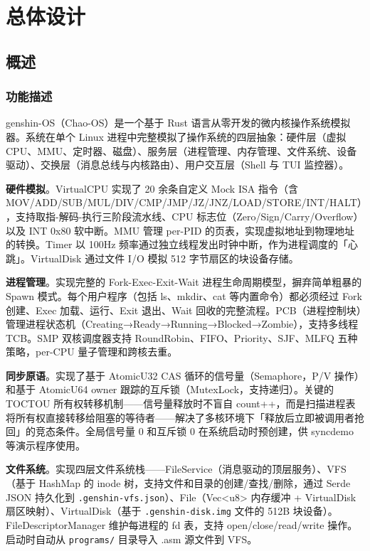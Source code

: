 \documentclass[UTF8,a4paper,12pt]{ctexart}
\begin{document}
\newpage


\section{总体设计}

\subsection{概述}

\subsubsection{功能描述}

genshin-OS（Chao-OS）是一个基于 Rust 语言从零开发的微内核操作系统模拟器。系统在单个 Linux 进程中完整模拟了操作系统的四层抽象：硬件层（虚拟 CPU、MMU、定时器、磁盘）、服务层（进程管理、内存管理、文件系统、设备驱动）、交换层（消息总线与内核路由）、用户交互层（Shell 与 TUI 监控器）。

\textbf{硬件模拟}。VirtualCPU 实现了 20 余条自定义 Mock ISA 指令（含 MOV/ADD/SUB/MUL/DIV/CMP/JMP/JZ/JNZ/LOAD/STORE/INT/HALT），支持取指-解码-执行三阶段流水线、CPU 标志位（Zero/Sign/Carry/Overflow）以及 INT 0x80 软中断。MMU 管理 per-PID 的页表，实现虚拟地址到物理地址的转换。Timer 以 100Hz 频率通过独立线程发出时钟中断，作为进程调度的「心跳」。VirtualDisk 通过文件 I/O 模拟 512 字节扇区的块设备存储。

\textbf{进程管理}。实现完整的 Fork-Exec-Exit-Wait 进程生命周期模型，摒弃简单粗暴的 Spawn 模式。每个用户程序（包括 ls、mkdir、cat 等内置命令）都必须经过 Fork 创建、Exec 加载、运行、Exit 退出、Wait 回收的完整流程。PCB（进程控制块）管理进程状态机（Creating→Ready→Running→Blocked→Zombie），支持多线程 TCB。SMP 双核调度器支持 RoundRobin、FIFO、Priority、SJF、MLFQ 五种策略，per-CPU 量子管理和跨核去重。

\textbf{同步原语}。实现了基于 AtomicU32 CAS 循环的信号量（Semaphore，P/V 操作）和基于 AtomicU64 owner 跟踪的互斥锁（MutexLock，支持递归）。关键的 TOCTOU 所有权转移机制——信号量释放时不盲自 count++，而是扫描进程表将所有权直接转移给阻塞的等待者——解决了多核环境下「释放后立即被调用者抢回」的竞态条件。全局信号量 0 和互斥锁 0 在系统启动时预创建，供 syncdemo 等演示程序使用。

\textbf{文件系统}。实现四层文件系统栈——FileService（消息驱动的顶层服务）、VFS（基于 HashMap 的 inode 树，支持文件和目录的创建/查找/删除，通过 Serde JSON 持久化到 \texttt{.genshin-vfs.json}）、File（Vec<u8> 内存缓冲 + VirtualDisk 扇区映射）、VirtualDisk（基于 \texttt{.genshin-disk.img} 文件的 512B 块设备）。FileDescriptorManager 维护每进程的 fd 表，支持 open/close/read/write 操作。启动时自动从 \texttt{programs/} 目录导入 .asm 源文件到 VFS。
\end{document}
